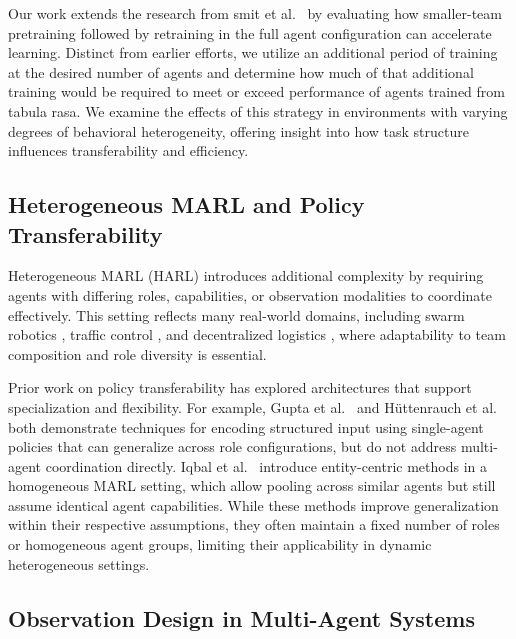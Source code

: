 \documentclass{article}
\begin{document}
Our work extends the research from smit et al.~\cite{smit2023}
by evaluating how smaller-team pretraining followed 
by retraining in the full agent configuration can accelerate learning. 
Distinct from earlier efforts, we utilize an additional period of training at 
the desired number of agents and determine how much of that additional training would 
be required to meet or exceed performance of agents trained from tabula rasa.
We examine the effects of this strategy in environments with varying degrees of 
behavioral heterogeneity, offering insight into how task structure influences 
transferability and efficiency.

\subsection{Heterogeneous MARL and Policy Transferability}

Heterogeneous MARL (HARL) introduces additional complexity by requiring agents with differing
roles, capabilities, or observation modalities to coordinate effectively. This setting reflects
many real-world domains, including swarm robotics \cite{hoang2023}, traffic control \cite{calvo2018},
and decentralized logistics \cite{rizk2019}, where adaptability to team composition and role diversity
is essential.

Prior work on policy transferability has explored architectures that support specialization 
and flexibility. For example, Gupta et al.~\cite{gupta2017a} and H{\"u}ttenrauch 
et al.~\cite{huttenrauch2019} both demonstrate techniques for encoding structured input 
using single-agent policies that can generalize across role configurations, but do not 
address multi-agent coordination directly. Iqbal et al.~\cite{iqbal2021} introduce 
entity-centric methods in a homogeneous MARL setting, which allow pooling across similar 
agents but still assume identical agent capabilities. While these methods improve 
generalization within their respective assumptions, they often maintain a fixed number of roles 
or homogeneous agent groups, limiting their applicability in dynamic heterogeneous settings.


\subsection{Observation Design in Multi-Agent Systems}
\label{sec:related_work-observation_design}
\end{document}
